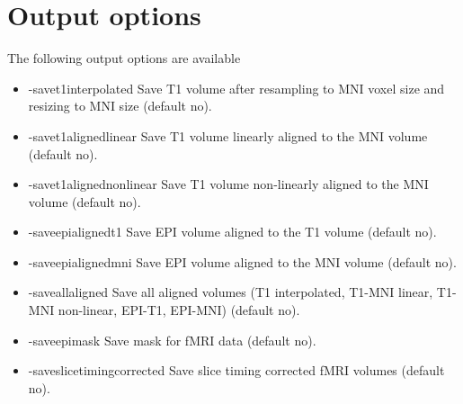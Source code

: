 \section{Output options}

The following output options are available

\begin{itemize}

\item -savet1interpolated        
\newline \newline Save T1 volume after resampling to MNI voxel size and resizing to MNI size (default no). 

\item -savet1alignedlinear       
\newline \newline Save T1 volume linearly aligned to the MNI volume (default no). 

\item -savet1alignednonlinear    
\newline \newline Save T1 volume non-linearly aligned to the MNI volume (default no). 

\item -saveepialignedt1          
\newline \newline Save EPI volume aligned to the T1 volume (default no). 

\newpage

\item -saveepialignedmni         
\newline \newline Save EPI volume aligned to the MNI volume (default no). 

\item -saveallaligned            
\newline \newline Save all aligned volumes (T1 interpolated, T1-MNI linear, T1-MNI non-linear, EPI-T1, EPI-MNI) (default no). 

\item -saveepimask               
\newline \newline Save mask for fMRI data  (default no). 

\item -saveslicetimingcorrected  
\newline \newline Save slice timing corrected fMRI volumes  (default no). 


\end{itemize}
